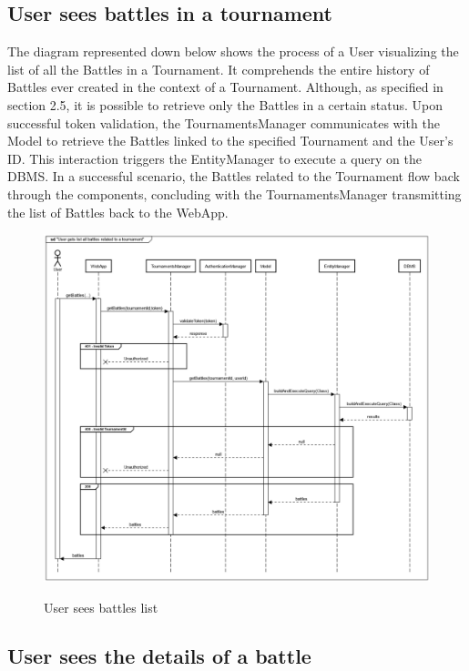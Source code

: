 \documentclass{Configuration_Files/Template}
\begin{document}
\subsection*{User sees battles in a tournament}

The diagram represented down below shows the process of a User visualizing the list of all the Battles in a Tournament. It comprehends the entire history of Battles ever created in the context of a Tournament. Although, as specified in section 2.5, it is possible to retrieve only the Battles in a certain status. Upon successful token validation, the TournamentsManager communicates with the Model to retrieve the Battles linked to the specified Tournament and the User's ID. This interaction triggers the EntityManager to execute a query on the DBMS. In a successful scenario, the Battles related to the Tournament flow back through the components, concluding with the TournamentsManager transmitting the list of Battles back to the WebApp. 

\begin{figure}[H]
\centering
\includegraphics[scale = 0.33]{Images/diagrams/sequences/GetBattles.png}\\
\caption{User sees battles list  }
\end{figure}

\subsection*{User sees the details of a battle}
\end{document}
